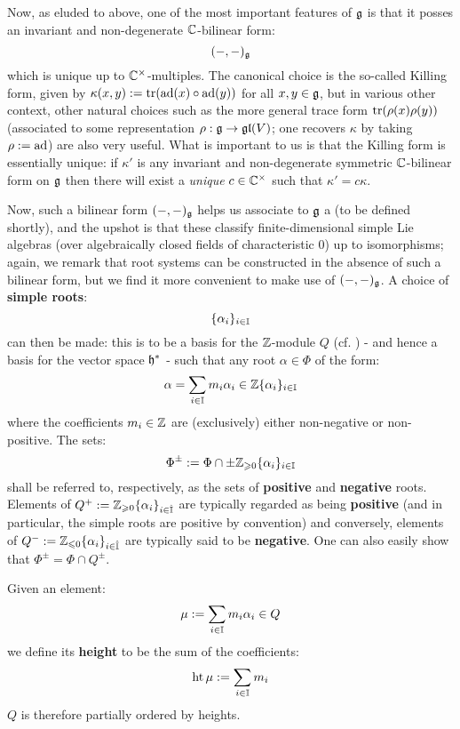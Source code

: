         Now, as eluded to above, one of the most important features of $\mathfrak{g}$ is that it posses an invariant and non-degenerate $\mathbb{C}$-bilinear form:
            $$(-, -)_{\mathfrak{g}}$$
        which is unique up to $\bbC^{\x}$-multiples. The canonical choice is the so-called Killing form, given by $\kappa(x, y) := \operatorname{tr}(\mathrm{ad}(x) \circ \mathrm{ad}(y))$ for all $x, y \in \mathfrak{g}$, but in various other context, other natural choices such as the more general trace form $\operatorname{tr}(\rho(x) \rho(y))$ (associated to some representation $\rho: \mathfrak{g} \to \mathfrak{gl}(V)$; one recovers $\kappa$ by taking $\rho := \mathrm{ad}$) are also very useful. What is important to us is that the Killing form is essentially unique: if $\kappa'$ is any invariant and non-degenerate symmetric $\mathbb{C}$-bilinear form on $\mathfrak{g}$ then there will exist a \textit{unique} $c \in \bbC^{\x}$ such that $\kappa' = c \kappa$.

        Now, such a bilinear form $(-, -)_{\mathfrak{g}}$ helps us associate to $\mathfrak{g}$ a  (to be defined shortly), and the upshot is that these  classify finite-dimensional simple Lie algebras (over algebraically closed fields of characteristic $0$) up to isomorphisms; again, we remark that root systems can be constructed in the absence of such a bilinear form, but we find it more convenient to make use of $(-, -)_{\mathfrak{g}}$. A choice of \textbf{simple roots}:
            $$\{\alpha_i\}_{i \in \mathbb{I}}$$
        can then be made: this is to be a basis for the $\mathbb{Z}$-module $Q$ (cf. \cite[Subsection 10.1, p. 47]{humphreys_lie_algebras}) - and hence a basis for the vector space $\mathfrak{h}^*$ - such that any root $\alpha \in \Phi$ of the form:
            $$\alpha = \sum_{i \in \mathbb{I}} m_i \alpha_i \in \mathbb{Z}\{\alpha_i\}_{i \in \mathbb{I}}$$
        where the coefficients $m_i \in \mathbb{Z}$ are (exclusively) either non-negative or non-positive. The sets:
            $$\Phi^{\pm} := \Phi \cap \pm \mathbb{Z}_{\geqslant 0} \{\alpha_i\}_{i \in \mathbb{I}}$$
        shall be referred to, respectively, as the sets of \textbf{positive} and \textbf{negative} roots. Elements of $Q^+ := \mathbb{Z}_{\geqslant 0} \{\alpha_i\}_{i \in \hat{\mathbb{I}}}$ are typically regarded as being \textbf{positive} (and in particular, the simple roots are positive by convention) and conversely, elements of $Q^- := \mathbb{Z}_{\leqslant 0} \{\alpha_i\}_{i \in \hat{\mathbb{I}}}$ are typically said to be \textbf{negative}. One can also easily show that $\Phi^{\pm} = \Phi \cap Q^{\pm}$. 

        Given an element:
            $$\mu := \sum_{i \in \mathbb{I}} m_i \alpha_i \in Q$$
        we define its \textbf{height} to be the sum of the coefficients:
            $$\operatorname{ht} \mu := \sum_{i \in \mathbb{I}} m_i$$
        $Q$ is therefore partially ordered by heights. 
        
